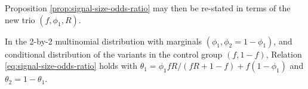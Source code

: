 Proposition \ref{prop:signal-size-odds-ratio} may then be re-stated in terms of the new trio $(f, \phi_1, R)$.


\begin{corollary} \label{cor:signal-size-odds-ratio-conditional-frequency}
In the 2-by-2 multinomial distribution with marginals $(\phi_1, \phi_2 = 1-\phi_1)$, and conditional distribution of the variants in the control group $(f, 1-f)$,
Relation \eqref{eq:signal-size-odds-ratio} holds with $\theta_1 = {\phi_1fR}/{(fR+1-f)} + f(1-\phi_1)$ and $\theta_2 = 1-\theta_1$.
\end{corollary} 

